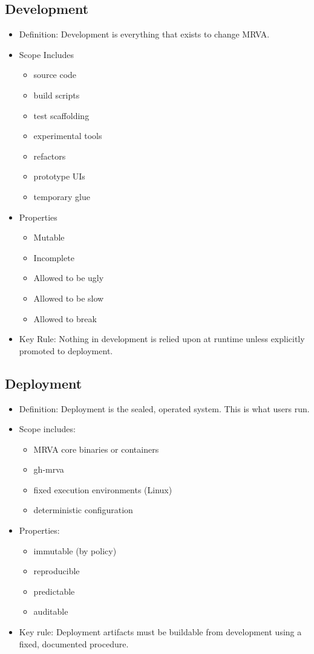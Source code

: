 \documentclass[11pt]{article}
\begin{document}
\subsection{Development}
\label{sec:org0f0dabe}
\begin{itemize}
\item Definition: Development is everything that exists to change MRVA.

\item Scope Includes
\begin{itemize}
\item source code
\item build scripts
\item test scaffolding
\item experimental tools
\item refactors
\item prototype UIs
\item temporary glue
\end{itemize}

\item Properties
\begin{itemize}
\item Mutable
\item Incomplete
\item Allowed to be ugly
\item Allowed to be slow
\item Allowed to break
\end{itemize}

\item Key Rule: Nothing in development is relied upon at runtime unless explicitly
promoted to deployment.
\end{itemize}
\subsection{Deployment}
\label{sec:org8f8aecc}
\begin{itemize}
\item Definition: Deployment is the sealed, operated system.
This is what users run.

\item Scope includes:
\begin{itemize}
\item MRVA core binaries or containers
\item gh-mrva
\item fixed execution environments (Linux)
\item deterministic configuration
\end{itemize}

\item Properties:
\begin{itemize}
\item immutable (by policy)
\item reproducible
\item predictable
\item auditable
\end{itemize}

\item Key rule:
Deployment artifacts must be buildable from development using a fixed,
documented procedure.
\end{itemize}
\end{document}
